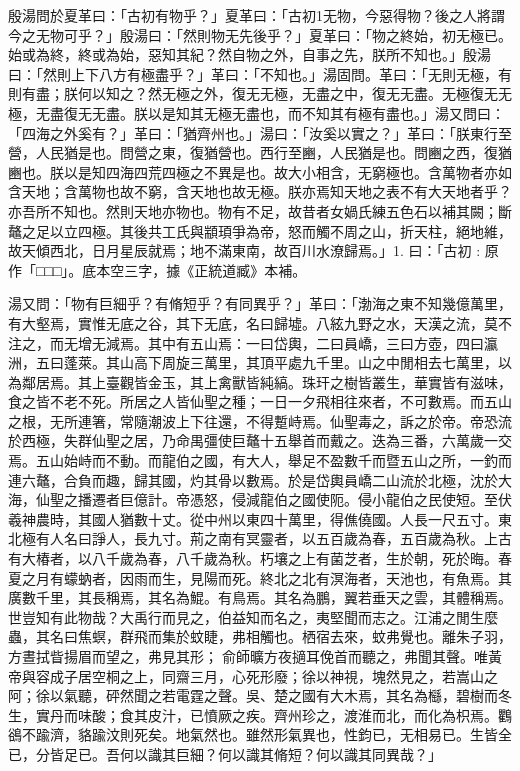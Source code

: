 
\begin{pinyinscope}
殷湯問於夏革曰：「古初有物乎？」夏革曰：「古初1无物，今惡得物？後之人將謂今之无物可乎？」殷湯曰：「然則物无先後乎？」夏革曰：「物之終始，初无極已。始或為終，終或為始，惡知其紀？然自物之外，自事之先，朕所不知也。」殷湯曰：「然則上下八方有極盡乎？」革曰：「不知也。」湯固問。革曰：「无則无極，有則有盡；朕何以知之？然无極之外，復无无極，无盡之中，復无无盡。无極復无无極，无盡復无无盡。朕以是知其无極无盡也，而不知其有極有盡也。」湯又問曰：「四海之外奚有？」革曰：「猶齊州也。」湯曰：「汝奚以實之？」革曰：「朕東行至營，人民猶是也。問營之東，復猶營也。西行至豳，人民猶是也。問豳之西，復猶豳也。朕以是知四海四荒四極之不異是也。故大小相含，无窮極也。含萬物者亦如含天地；含萬物也故不窮，含天地也故无極。朕亦焉知天地之表不有大天地者乎？亦吾所不知也。然則天地亦物也。物有不足，故昔者女媧氏練五色石以補其闕；斷鼇之足以立四極。其後共工氏與顓頊爭為帝，怒而觸不周之山，折天柱，絕地維，故天傾西北，日月星辰就焉；地不滿東南，故百川水潦歸焉。」1. 曰：「古初 : 原作「□□□」。底本空三字，據《正統道臧》本補。

湯又問：「物有巨細乎？有脩短乎？有同異乎？」革曰：「渤海之東不知幾億萬里，有大壑焉，實惟无底之谷，其下无底，名曰歸墟。八絃九野之水，天漢之流，莫不注之，而无增无減焉。其中有五山焉：一曰岱輿，二曰員嶠，三曰方壺，四曰瀛洲，五曰蓬萊。其山高下周旋三萬里，其頂平處九千里。山之中閒相去七萬里，以為鄰居焉。其上臺觀皆金玉，其上禽獸皆純縞。珠玕之樹皆叢生，華實皆有滋味，食之皆不老不死。所居之人皆仙聖之種；一日一夕飛相往來者，不可數焉。而五山之根，无所連箸，常隨潮波上下往還，不得蹔峙焉。仙聖毒之，訴之於帝。帝恐流於西極，失群仙聖之居，乃命禺彊使巨鼇十五舉首而戴之。迭為三番，六萬歲一交焉。五山始峙而不動。而龍伯之國，有大人，舉足不盈數千而暨五山之所，一釣而連六鼇，合負而趣，歸其國，灼其骨以數焉。於是岱輿員嶠二山流於北極，沈於大海，仙聖之播遷者巨億計。帝憑怒，侵減龍伯之國使阨。侵小龍伯之民使短。至伏羲神農時，其國人猶數十丈。從中州以東四十萬里，得僬僥國。人長一尺五寸。東北極有人名曰諍人，長九寸。荊之南有冥靈者，以五百歲為春，五百歲為秋。上古有大椿者，以八千歲為春，八千歲為秋。朽壤之上有菌芝者，生於朝，死於晦。春夏之月有蠓蚋者，因雨而生，見陽而死。終北之北有溟海者，天池也，有魚焉。其廣數千里，其長稱焉，其名為鯤。有鳥焉。其名為鵬，翼若垂天之雲，其體稱焉。世豈知有此物哉？大禹行而見之，伯益知而名之，夷堅聞而志之。江浦之閒生麼蟲，其名曰焦螟，群飛而集於蚊睫，弗相觸也。栖宿去來，蚊弗覺也。離朱子羽，方晝拭眥揚眉而望之，弗見其形；𧣾俞師曠方夜擿耳俛首而聽之，弗聞其聲。唯黃帝與容成子居空桐之上，同齋三月，心死形廢；徐以神視，塊然見之，若嵩山之阿；徐以氣聽，砰然聞之若電霆之聲。吳、楚之國有大木焉，其名為櫾，碧樹而冬生，實丹而味酸；食其皮汁，已憤厥之疾。齊州珍之，渡淮而北，而化為枳焉。鸜鵒不踰濟，貉踰汶則死矣。地氣然也。雖然形氣異也，性鈞已，无相易已。生皆全已，分皆足已。吾何以識其巨細？何以識其脩短？何以識其同異哉？」


\end{pinyinscope}
